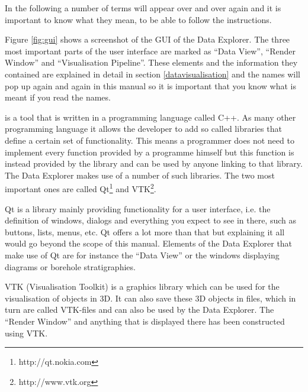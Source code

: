 In the following a number of terms will appear over and over again and it is important to know what they mean, to be able to follow the instructions.

Figure \ref{fig:gui} shows a screenshot of the GUI of the \ogs Data Explorer. The three most important parts of the user interface are marked as ``Data View'', ``Render Window'' and ``Visualisation Pipeline''. These elements and the information they contained are explained in detail in section \ref{datavisualisation} and the names will pop up again and again in this manual so it is important that you know what is meant if you read the names.

\ogs is a tool that is written in a programming language called C++. As many other programming language it allows the developer to add so called libraries that define a certain set of functionality. This means a programmer does not need to implement every function provided by a programme himself but this function is instead provided by the library and can be used by anyone linking to that library. The Data Explorer makes use of a number of such libraries. The two most important ones are called Qt\footnote{http://qt.nokia.com} and VTK\footnote{http://www.vtk.org}.

Qt is a library mainly providing functionality for a user interface, i.e. the definition of windows, dialogs and everything you expect to see in there, such as buttons, lists, menus, etc. Qt offers a lot more than that but explaining it all would go beyond the scope of this manual. Elements of the Data Explorer that make use of Qt are for instance the ``Data View'' or the windows displaying diagrams or borehole stratigraphies.

VTK (Visualisation Toolkit) is a graphics library which can be used for the visualisation of objects in 3D. It can also save these 3D objects in files, which in turn are called VTK-files and can also be used by the Data Explorer. The ``Render Window'' and anything that is displayed there has been constructed using VTK.

